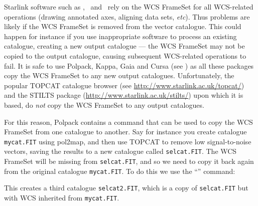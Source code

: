 Starlink software such as \polpack, \Kappa\ and \gaia\ rely on the WCS
FrameSet for all WCS-related operations (drawing annotated axes, aligning
data sets, \emph{etc}). Thus problems are likely if the WCS FrameSet is
removed from the vector catalogue. This could happen for instance if you
use inappropriate software to process an existing catalogue, creating a
new output catalogue --- the WCS FrameSet may not be copied to the output
catalogue, causing subsequent WCS-related operations to fail. It is safe
to use Polpack, Kappa, Gaia and Cursa (see ) as
all these packages copy the WCS FrameSet to any new output catalogues.
Unfortunately, the popular TOPCAT catalogue browser (see
\url{http://www.starlink.ac.uk/topcat/}) and the STILTS package
(\url{http://www.starlink.ac.uk/stilts/}) upon which it is based, do
\emph{not} copy the WCS FrameSet to any output catalogues.

For this reason, Polpack contains a command that can be used to copy the
WCS FrameSet from one catalogue to another.  Say for instance you create
catalogue \texttt{mycat.FIT} using pol2map, and then use TOPCAT to remove
low signal-to-noise vectors, saving the results to a new catalogue called
\texttt{selcat.FIT}. The WCS FrameSet will be missing from \texttt{selcat.FIT},
and so we need to copy it back again from the original catalogue \texttt{mycat.FIT}.
To do this we use the ``'' command:

\begin{terminalv}
\end{terminalv}

This creates a third catalogue \texttt{selcat2.FIT}, which is a copy of
\texttt{selcat.FIT} but with WCS inherited from \texttt{mycat.FIT}.






